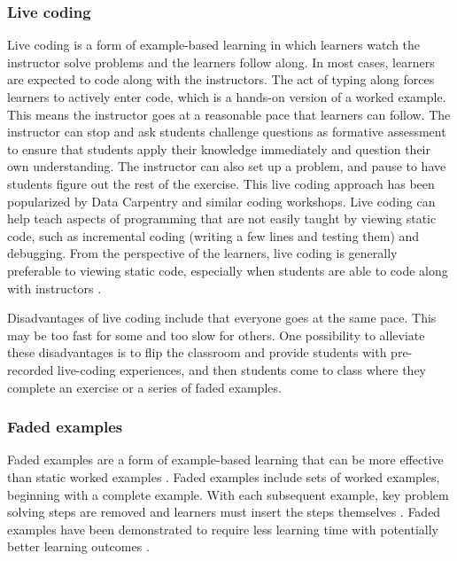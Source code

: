 \subsubsection{Live coding}\label{Livecoding}

Live coding is a form of example-based learning in which learners watch the instructor solve problems and the learners follow along. 
In most cases, learners are expected to code along with the instructors. 
The act of typing along forces learners to actively enter code, which is a hands-on version of a worked example.
This means the instructor goes at a reasonable pace that learners can follow.
The instructor can stop and ask students challenge questions as formative assessment to ensure that students apply their knowledge immediately and question their own understanding. 
The instructor can also set up a problem, and pause to have students figure out the rest of the exercise. 
This live coding approach has been popularized by Data Carpentry and similar coding workshops.
Live coding can help teach aspects of programming that are not easily taught by viewing static code, such as incremental coding (writing a few lines and testing them) and debugging. 
From the perspective of the learners, live coding is generally preferable to viewing static code, especially when students are able to code along with instructors \citep{raj_role_2018}.


Disadvantages of live coding include that everyone goes at the same pace.
This may be too fast for some and too slow for others.
One possibility to alleviate these disadvantages is to flip the classroom and provide students with pre-recorded live-coding experiences, and then students come to class where they complete an exercise or a series of faded examples. 


\subsubsection{Faded examples}\label{Fillable} 
Faded examples are a form of example-based learning that can be more effective than static worked examples \citep{schwonke_worked-example_2009}.
Faded examples include sets of worked examples, beginning with a complete example. 
With each subsequent example, key problem solving steps are removed and learners must insert the steps themselves \citep{renkl_toward_2014}. 
Faded examples have been demonstrated to require less learning time with potentially better learning outcomes \citep{schwonke_worked-example_2009}. 

